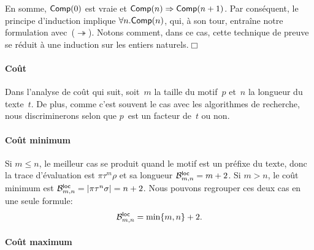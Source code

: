 En somme, \(\pred{Comp}{0}\) est vraie et \(\pred{Comp}{n} \Rightarrow
\pred{Comp}{n+1}\). Par conséquent, le principe d'induction implique
\(\forall n.\pred{Comp}{n}\), qui, à son tour, entraîne notre
formulation avec~(\(\twoheadrightarrow\)). Notons comment, dans ce
cas, cette technique de preuve se réduit à une induction sur les
entiers naturels.\hfill\(\Box\) 

\paragraph{Coût}

Dans l'analyse de coût qui suit, soit~\(m\) la taille du motif~\(p\)
et~\(n\) la longueur du texte~\(t\). De plus, comme c'est souvent le
cas avec les algorithmes de recherche, nous discriminerons selon que
\(p\)~est un facteur de~\(t\) ou non.

\paragraph{Coût minimum}

Si \(m \leqslant n\), le meilleur cas se produit quand le motif est un
préfixe du texte, donc la trace d'évaluation est \(\pi\tau^m\rho\) et
sa longueur \(\B{\fun{loc}}{m,n} = m + 2\). Si \(m > n \), le coût
minimum est \(\B{\fun{loc}}{m,n} = \len{\pi\tau^n\sigma} = n +
2\). Nous pouvons regrouper ces deux cas en une seule formule:
\begin{equation*}
\B{\fun{loc}}{m,n} = \min\{m,n\} + 2.\index{loc@$\B{\fun{loc}}{m,n}$}
\end{equation*}

\paragraph{Coût maximum}

